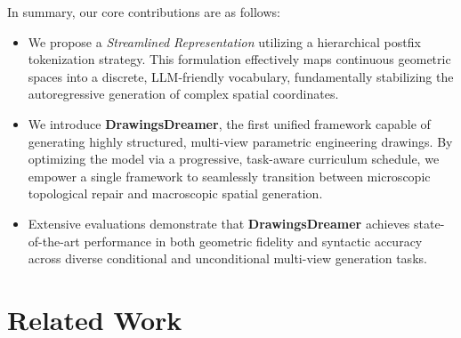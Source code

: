 \documentclass{article}
\begin{document}
In summary, our core contributions are as follows:




\begin{itemize}
\item We propose a \textit{Streamlined Representation} utilizing a hierarchical postfix tokenization strategy. This formulation effectively maps continuous geometric spaces into a discrete, LLM-friendly vocabulary, fundamentally stabilizing the autoregressive generation of complex spatial coordinates.
\item We introduce \textbf{DrawingsDreamer}, the first unified framework capable of generating highly structured, multi-view parametric engineering drawings. By optimizing the model via a progressive, task-aware curriculum schedule, we empower a single framework to seamlessly transition between microscopic topological repair and macroscopic spatial generation.
\item Extensive evaluations demonstrate that \textbf{DrawingsDreamer} achieves state-of-the-art performance in both geometric fidelity and syntactic accuracy across diverse conditional and unconditional multi-view generation tasks.
\end{itemize}



\section{Related Work}
\end{document}
